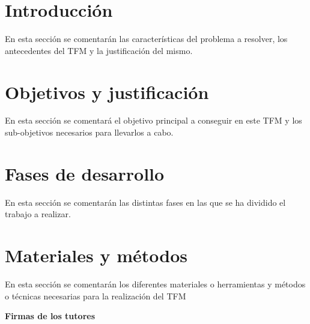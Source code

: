 \documentclass[titlepage, 12pt, a4paper, oneside]{article}
\begin{document}
\normalsize

\section{Introducción}
\cite{einstein1922kosmologische}
En esta sección se comentarán las características del problema a resolver, los antecedentes del TFM y la justificación del mismo.

\section{Objetivos y justificación}
En esta sección se comentará el objetivo principal a conseguir en este TFM y los sub-objetivos necesarios para llevarlos a cabo.

\section{Fases de desarrollo}
En esta sección se comentarán las distintas fases en las que se ha dividido el trabajo a realizar.

\section{Materiales y métodos}
En esta sección se comentarán los diferentes materiales o herramientas y métodos o técnicas necesarias para la realización del TFM




\begin{center}
  \textbf{Firmas de los tutores}
\end{center}
\end{document}
